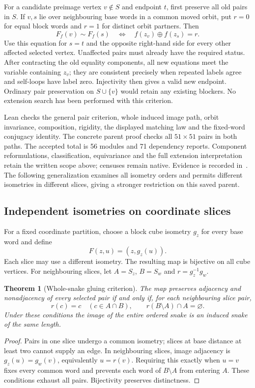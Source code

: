 \documentclass[11pt,a4paper]{article}
\newtheorem{theorem}{Theorem}[section]
\theoremstyle{definition}
\theoremstyle{remark}
\begin{document}
For a candidate preimage vertex $v\notin S$ and endpoint $t$, first
preserve all old pairs in $S$. If $v,s$ lie over neighbouring base
words in a common moved orbit, put $r=0$ for equal block words and
$r=1$ for distinct orbit partners. Then
\[
F_f(v)\sim F_f(s)\quad\Longleftrightarrow\quad
f(z_v)\oplus f(z_s)=r.
\]
Use this equation for $s=t$ and the opposite right-hand side for every
other affected selected vertex. Unaffected pairs must already have
the required status. After contracting the old equality components,
all new equations meet the variable containing $z_v$; they are
consistent precisely when repeated labels agree and self-loops have
label zero. Injectivity then gives a valid new endpoint. Ordinary
pair preservation on $S\cup\{v\}$ would retain any existing blockers.
No extension search has been performed with this criterion.

Lean checks the general pair criterion, whole induced image path,
orbit invariance, composition, rigidity, the displayed matching law
and the fixed-word conjugacy identity. The concrete parent proof
checks all $51\times51$ pairs in both paths. The accepted total is
56 modules and 71 dependency reports. Component reformulations,
classification, equivariance and the full extension interpretation
retain the written scope above; censuses remain native. Evidence is
recorded in~\cite{research203}. The following generalization examines
all isometry orders and permits different isometries in different
slices, giving a stronger restriction on this saved parent.

\subsection{Independent isometries on coordinate slices}
\label{sec:slices204}
For a fixed coordinate partition, choose a block cube isometry $g_z$
for every base word and define
\[
F(z,u)=(z,g_z(u)).
\]
Each slice may use a different isometry. The resulting map is bijective
on all cube vertices. For neighbouring slices, let $A=S_z$, $B=S_w$
and $r=g_z^{-1}g_w$.

\begin{theorem}[Whole-snake gluing criterion]
\label{thm:slices204}
The map preserves adjacency and nonadjacency of every selected pair
if and only if, for each neighbouring slice pair,
\[
r(c)=c\quad(c\in A\cap B),\qquad
r(B\setminus A)\cap A=\varnothing.
\]
Under these conditions the image of the entire ordered snake is
an induced snake of the same length.
\end{theorem}
\begin{proof}
Pairs in one slice undergo a common isometry; slices at base distance
at least two cannot supply an edge. In neighbouring slices, image
adjacency is $g_z(u)=g_w(v)$, equivalently $u=r(v)$. Requiring this
exactly when $u=v$ fixes every common word and prevents each word of
$B\setminus A$ from entering $A$. These conditions exhaust all pairs.
Bijectivity preserves distinctness.
\end{proof}
\end{document}
